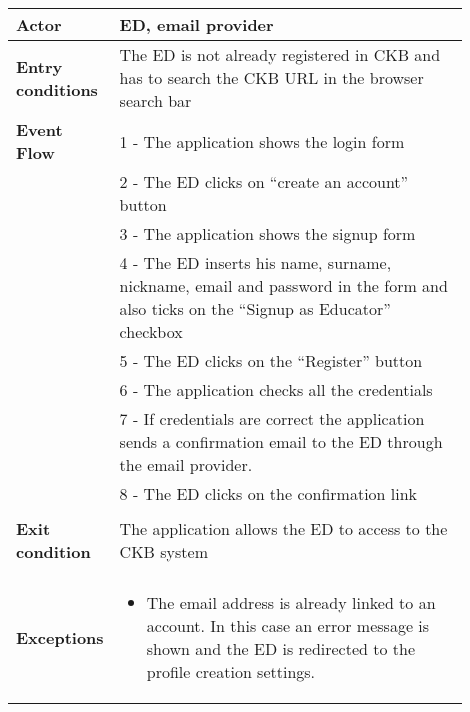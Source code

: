 \begin{center}
    \begin{longtable}{|l|p{0.9\linewidth}|}
        \hline
        \textbf{Actor}            & ED, email provider                                                                                                                                                                                        \\
        \hline
        \textbf{Entry conditions} & The ED is not already registered in CKB and has to search the CKB URL in the browser search bar                                                                                                                   \\
        \hline
        \textbf{Event Flow}       & 1 - The application shows the login form  \\
        & 2 - The ED clicks on “create an account” button   \\
        & 3 - The application shows the signup form    \\
        & 4 - The ED inserts his name, surname, nickname, email and password in the form and also ticks on the “Signup as Educator” checkbox  \\
        & 5 - The ED clicks on the “Register” button  \\
        & 6 - The application checks all the credentials  \\
        & 7 - If credentials are correct the application sends a confirmation email to the ED through the email provider.  \\
        & 8 - The ED clicks on the confirmation link                                                                         \\                                                                                                                                                            \\
        \hline
        \textbf{Exit condition}   & The application allows the ED to access to the CKB system \\                                                                                                                                                                                \\
        \hline
        \textbf{Exceptions}       & \begin{itemize}
            \item The email address is already linked to an account. In this case an error message is shown and the ED is redirected to the profile creation settings.

\end{itemize}
\end{longtable}
\end{center}
